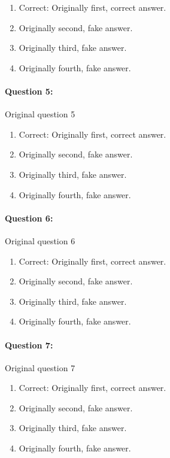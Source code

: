 \documentclass[9pt, twoside, twocolumn]{extarticle}
\begin{document}
\begin{enumerate}[label=\textbf{{\Alph*}},labelindent=0pt, labelsep=1.5em, parsep=0.2em]
\item Correct: Originally first, correct answer.
\item Originally second, fake answer.
\item Originally third, fake answer.
\item Originally fourth, fake answer.
\end{enumerate}
\paragraph{Question 5:}
Original question 5

\begin{enumerate}[label=\textbf{{\Alph*}},labelindent=0pt, labelsep=1.5em, parsep=0.2em]
\item Correct: Originally first, correct answer.
\item Originally second, fake answer.
\item Originally third, fake answer.
\item Originally fourth, fake answer.
\end{enumerate}
\paragraph{Question 6:}
Original question 6

\begin{enumerate}[label=\textbf{{\Alph*}},labelindent=0pt, labelsep=1.5em, parsep=0.2em]
\item Correct: Originally first, correct answer.
\item Originally second, fake answer.
\item Originally third, fake answer.
\item Originally fourth, fake answer.
\end{enumerate}
\paragraph{Question 7:}
Original question 7

\begin{enumerate}[label=\textbf{{\Alph*}},labelindent=0pt, labelsep=1.5em, parsep=0.2em]
\item Correct: Originally first, correct answer.
\item Originally second, fake answer.
\item Originally third, fake answer.
\item Originally fourth, fake answer.
\end{enumerate}
\end{document}
